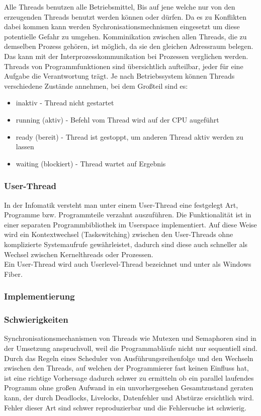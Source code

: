 \documentclass[12pt,a4paper]{report}
\begin{document}
Alle Threads benutzen alle Betriebsmittel, Bis auf jene welche nur von den erzeugenden Threads benutzt werden können oder dürfen. Da es zu Konflikten dabei kommen kann werden Sychronisationsmechnismen eingesetzt um diese potentielle Gefahr zu umgehen.
Komminikation zwischen allen Threads, die zu demselben Prozess gehören, ist möglich, da sie den gleichen Adressraum belegen. Das kann mit der Interprozesskommunikation bei Prozessen verglichen werden.\\

Threads von Programmfunktionen sind übersichtlich aufteilbar, jeder für eine Aufgabe die Verantwortung trägt. Je nach Betriebssystem können Threads verschiedene Zustände annehmen, bei dem Großteil sind es: 
\begin{itemize}
\item inaktiv -  Thread nicht gestartet
\item running (aktiv) - Befehl vom Thread wird auf der CPU augeführt
\item ready (bereit) - Thread ist gestoppt, um anderen Thread aktiv werden zu lassen
\item waiting (blockiert) - Thread wartet auf Ergebnis
\end{itemize}

\subsubsection{User-Thread}
In der Infomatik versteht man unter einem User-Thread eine festgelegt Art, Programme bzw. Programmteile verzahnt auszuführen. Die Funktionalität ist in einer separaten Programmbibliothek im Userspace implementiert. Auf diese Weise wird ein Kontextwechsel (Taskswitching) zwischen den User-Threads ohne komplizierte Systemaufrufe gewährleistet, dadurch sind diese auch schneller als Wechsel zwischen Kernelthreads oder Prozessen.\\
Ein User-Thread wird auch Userlevel-Thread bezeichnet und unter als Windows Fiber.

\subsubsection{Implementierung}

\subsubsection{Schwierigkeiten}
Synchronisationsmechanismen von Threads wie Mutexen und Semaphoren sind in der Umsetzung anspruchvoll, weil die Programmabläufe nicht nur sequentiell sind. Durch das Regeln eines Scheduler von Ausführungsreihenfolge und den Wechseln zwischen den Threads, auf welchen der Programmierer fast keinen Einfluss hat, ist eine richtige Vorhersage dadurch schwer zu ermitteln ob ein parallel laufendes Programm ohne großen Aufwand in ein unvorhergesehen Gesamtzustand geraten kann, der durch Deadlocks, Livelocks, Datenfehler und Abstürze ersichtlich wird.\\
Fehler dieser Art sind schwer reproduzierbar und die Fehlersuche ist schwierig.
\end{document}
